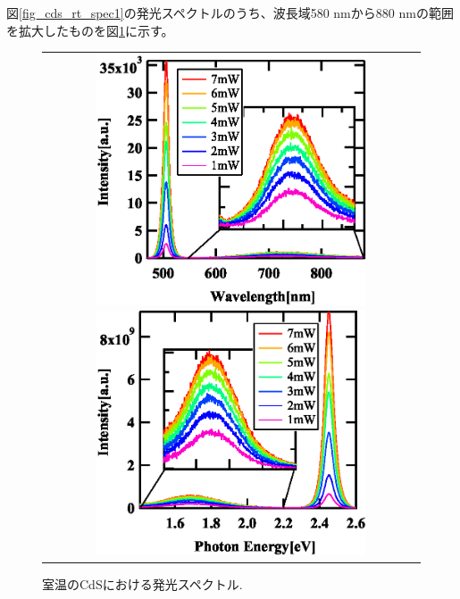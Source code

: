 \documentclass[11pt,a4j]{jsarticle}
\begin{document}
図\ref{fig_cds_rt_spec1}の発光スペクトルのうち、波長域580 nmから880 nmの範囲を拡大したものを図\ref{fig_cds_imp_spec1}に示す。

\newpage
\begin{figure}[ht]
 \centering
 \begin{tabular}{c}

  \begin{minipage}{0.5\hsize}

   \includegraphics[clip,width=8cm]{start2_CdS_imp_Spectrum_wav.eps}
  \end{minipage}

  \begin{minipage}{0.06\hsize}%
   \hspace{5mm}
  \end{minipage}

  \begin{minipage}{0.5\hsize}
   \centering
   \includegraphics[clip,width=8cm]{start2_CdS_imp_Spectrum_eV.eps}
  \end{minipage}
 \end{tabular}
 \caption{室温のCdSにおける発光スペクトル.}
 \label{fig_cds_imp_spec1}

\end{figure}
\end{document}
